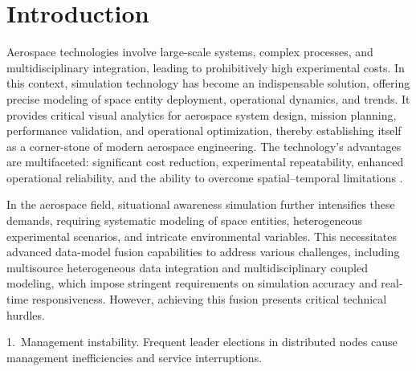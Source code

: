 \documentclass[twoside,twocolumn]{article}
\begin{document}





\maketitle


\section{Introduction} \label{sec:introduction}
Aerospace technologies involve large-scale systems, complex processes, and multidisciplinary integration, leading to prohibitively high experimental costs. In this context, simulation technology has become an indispensable solution, offering precise modeling of space entity deployment, operational dynamics, and trends. It provides critical visual analytics for aerospace system design, mission planning, performance validation, and operational optimization, thereby establishing itself as a corner-stone of modern aerospace engineering. The technology's advantages are multifaceted: significant cost reduction, experimental repeatability, enhanced operational reliability, and the ability to overcome spatial--temporal limitations \citep{Ding2025}.

In the aerospace field, situational awareness simulation further intensifies these demands, requiring systematic modeling of space entities, heterogeneous experimental scenarios, and intricate environmental variables. This necessitates advanced data-model fusion capabilities to address various challenges, including multisource heterogeneous data integration and multidisciplinary coupled modeling, which impose stringent requirements on simulation accuracy and real-time responsiveness. However, achieving this fusion presents critical technical hurdles.

1.~Management instability. Frequent leader elections in distributed nodes cause management inefficiencies and service interruptions.
\end{document}
